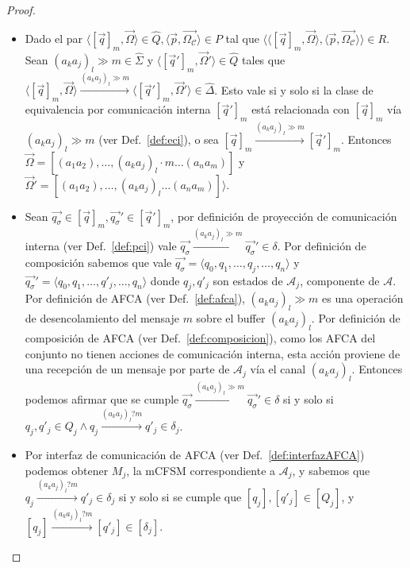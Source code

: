 \begin{proof}
\begin{itemize}
    \item Dado el par $\langle [\overrightarrow{q}]_m, \overrightarrow{\Omega} \rangle \in \widehat{Q}, \langle \overrightarrow{p}, \overrightarrow{\Omega_\mathcal{C}} \rangle \in P$ tal que $\langle \langle [\overrightarrow{q}]_m, \overrightarrow{\Omega} \rangle, \langle \overrightarrow{p}, \overrightarrow{\Omega_\mathcal{C}} \rangle \rangle \in R$. Sean $(a_ka_j)_l \gg m \in \widehat{\Sigma}$ y $\langle [\overrightarrow{q}']_m, \overrightarrow{\Omega}' \rangle \in \widehat{Q}$ tales que $\langle [\overrightarrow{q}]_m, \overrightarrow{\Omega} \rangle \xrightarrow{(a_ka_j)_l \gg m} \langle [\overrightarrow{q}']_m, \overrightarrow{\Omega}' \rangle \in \widehat{\Delta}$.  Esto vale si y solo si la clase de equivalencia por comunicación interna $[\overrightarrow{q}']_m$ está relacionada con $[\overrightarrow{q}]_m$ vía $(a_ka_j)_l \gg m$ (ver Def.~\ref{def:eci}), o sea $[\overrightarrow{q}]_m \xrightarrow{(a_ka_j)_l \gg m} [\overrightarrow{q}']_m$. Entonces $\overrightarrow{\Omega} = [(a_1a_2), \ldots, (a_ka_j)_l \cdot m \ldots (a_na_m)]$ y $\overrightarrow{\Omega}' = [(a_1a_2), \ldots, (a_ka_j)_l \ldots (a_na_m)] \rangle$.
    
    \item Sean $\overrightarrow{q_{\sigma}} \in [\overrightarrow{q}]_m, \overrightarrow{q_{\sigma}}' \in [\overrightarrow{q}']_m$, por definición de proyección de comunicación interna (ver Def.~\ref{def:pci}) vale $\overrightarrow{q_{\sigma}} \xrightarrow{(a_ka_j)_l \gg m} \overrightarrow{q_{\sigma}}' \in \delta$. Por definición de composición sabemos que vale $\overrightarrow{q_{\sigma}} =\langle q_0, q_1, \ldots, q_j, \ldots,q_n \rangle$ y $\overrightarrow{q_{\sigma}}' =\langle q_0, q_1, \ldots, q'_j, \ldots,q_n \rangle$ donde $q_j,q'_j$ son estados de $\mathcal{A}_j$, componente de $\mathcal{A}$. Por definición de AFCA (ver Def.~\ref{def:afca}), $(a_ka_j)_l \gg m$ es una operación de desencolamiento del mensaje $m$ sobre el buffer $(a_ka_j)_l$. Por definición de composición de AFCA (ver Def.~\ref{def:composicion}), como los AFCA del conjunto no tienen acciones de comunicación interna, esta acción proviene de una recepción de un mensaje por parte de $\mathcal{A}_j$ vía el canal $(a_ka_j)_l$. Entonces podemos afirmar que se cumple $\overrightarrow{q_{\sigma}} \xrightarrow{(a_ka_j)_l \gg m} \overrightarrow{q_{\sigma}}'\in \delta$ si y solo si $q_j,q'_j \in Q_j \land q_j \xrightarrow{(a_ka_j)_l?m} q'_j \in \delta_j$.
    
    \item Por interfaz de comunicación de AFCA (ver Def.~\ref{def:interfazAFCA}) podemos obtener $M_j$, la mCFSM correspondiente a $\mathcal{A}_j$, y sabemos que $q_j \xrightarrow{(a_ka_j)_l?m} q'_j \in \delta_j$ si y solo si se cumple que $[q_j], [q'_j] \in [Q_j] $, y $[q_j] \xrightarrow{(a_ka_j)_l?m} [q'_j] \in [\delta_j]$. 
    

\end{itemize}
\end{proof}
